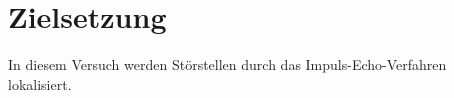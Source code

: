\section{Zielsetzung} 

\begin{flushleft}   
    In diesem Versuch werden Störstellen durch das Impuls-Echo-Verfahren lokalisiert.
\end{flushleft}


